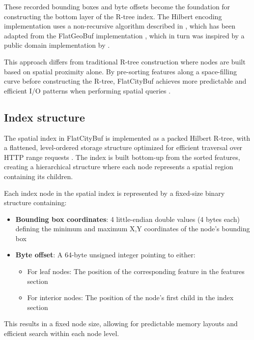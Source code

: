 These recorded bounding boxes and byte offsets become the foundation for constructing the bottom layer of the R-tree index. The Hilbert encoding implementation uses a non-recursive algorithm described in \citet{hacker_delight_2012}, which has been adapted from the FlatGeoBuf implementation \citep{flatgeobuf_github}, which in turn was inspired by a public domain implementation by \citet{rawrunprotected_2016}.

This approach differs from traditional R-tree construction where nodes are built based on spatial proximity alone. By pre-sorting features along a space-filling curve before constructing the R-tree, FlatCityBuf achieves more predictable and efficient I/O patterns when performing spatial queries \citep{horance_2022_overview}.

\subsection{Index structure}
\label{methodology:spatial_index:index_structure}

The spatial index in FlatCityBuf is implemented as a packed Hilbert R-tree, with a flattened, level-ordered storage structure optimized for efficient traversal over HTTP range requests \citep{horance_2022_detail}. The index is built bottom-up from the sorted features, creating a hierarchical structure where each node represents a spatial region containing its children.

Each index node in the spatial index is represented by a fixed-size binary structure containing:

\begin{itemize}
    \item \textbf{Bounding box coordinates}: 4 little-endian double values (4 bytes each) defining the minimum and maximum X,Y coordinates of the node's bounding box
    \item \textbf{Byte offset}: A 64-byte unsigned integer pointing to either:
    \begin{itemize}
        \item For leaf nodes: The position of the corresponding feature in the features section
        \item For interior nodes: The position of the node's first child in the index section
    \end{itemize}
\end{itemize}

This results in a fixed node size, allowing for predictable memory layouts and efficient search within each node level.

